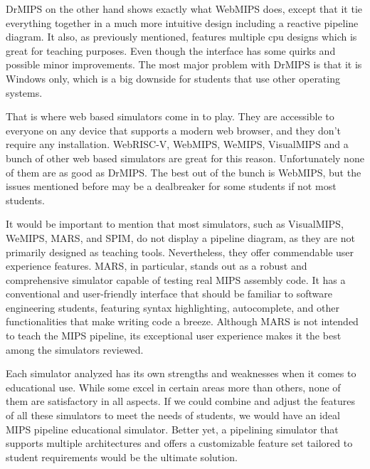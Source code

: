 DrMIPS on the other hand shows exactly what WebMIPS does, except that it tie everything together in a much more intuitive design including a reactive pipeline diagram. It also, as previously mentioned, features multiple cpu designs which is great for teaching purposes. Even though the interface has some quirks and possible minor improvements. The most major problem with DrMIPS is that it is Windows only, which is a big downside for students that use other operating systems.

That is where web based simulators come in to play. They are accessible to everyone on any device that supports a modern web browser, and they don't require any installation. WebRISC-V, WebMIPS, WeMIPS, VisualMIPS and a bunch of other web based simulators are great for this reason. Unfortunately none of them are as good as DrMIPS. The best out of the bunch is WebMIPS, but the issues mentioned before may be a dealbreaker for some students if not most students.

It would be important to mention that most simulators, such as VisualMIPS, WeMIPS, MARS, and SPIM, do not display a pipeline diagram, as they are not primarily designed as teaching tools. Nevertheless, they offer commendable user experience features. MARS, in particular, stands out as a robust and comprehensive simulator capable of testing real MIPS assembly code. It has a conventional and user-friendly interface that should be familiar to software engineering students, featuring syntax highlighting, autocomplete, and other functionalities that make writing code a breeze. Although MARS is not intended to teach the MIPS pipeline, its exceptional user experience makes it the best among the simulators reviewed.

Each simulator analyzed has its own strengths and weaknesses when it comes to educational use. While some excel in certain areas more than others, none of them are satisfactory in all aspects. If we could combine and adjust the features of all these simulators to meet the needs of students, we would have an ideal MIPS pipeline educational simulator. Better yet, a pipelining simulator that supports multiple architectures and offers a customizable feature set tailored to student requirements would be the ultimate solution.

